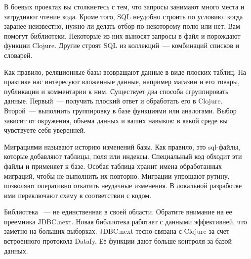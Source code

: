 В боевых проектах вы столкнетесь с тем, что запросы занимают много места и затрудняют чтение кода. Кроме того, SQL неудобно строить по условию, когда заранее неизвестно, нужно ли делать отбор по некоторому полю или нет. Вам помогут библиотеки. Некоторые из них выносят запросы в файл и порождают функции Clojure. Другие строят SQL из коллекций~--- комбинаций списков и словарей.

Как правило, реляционные базы возвращают данные в виде плоских таблиц. На практике нас интересуют вложенные данные, например магазин и его товары, публикации и комментарии к ним. Существует два способа сгруппировать данные. Первый~--- получить плоский ответ и обработать его в Clojure. Второй~--- выполнить группировку в базе функциями  или аналогами. Выбор зависит от окружения, объема данных и ваших навыков: в какой среде вы чувствуете себя уверенней.

Миграциями называют историю изменений базы. Как правило, это sql-файлы, которые добавляют таблицы, поля или индексы. Специальный код обходит эти файлы и применяет к базе. Особая таблица хранит имена обработанных миграций, чтобы не выполнить их повторно. Миграции упрощают рутину, позволяют оперативно откатить неудачные изменения. В локальной разработке ими переключают схему в соответствии с кодом.

Библиотека ~--- не единственная в своей области. Обратите внимание на ее преемника JDBC.next. Новая библиотека работает с данными эффективней, что заметно на больших выборках. JDBC.next тесно связана с Clojure за счет встроенного протокола Datafy. Ее функции дают больше контроля за базой данных.
